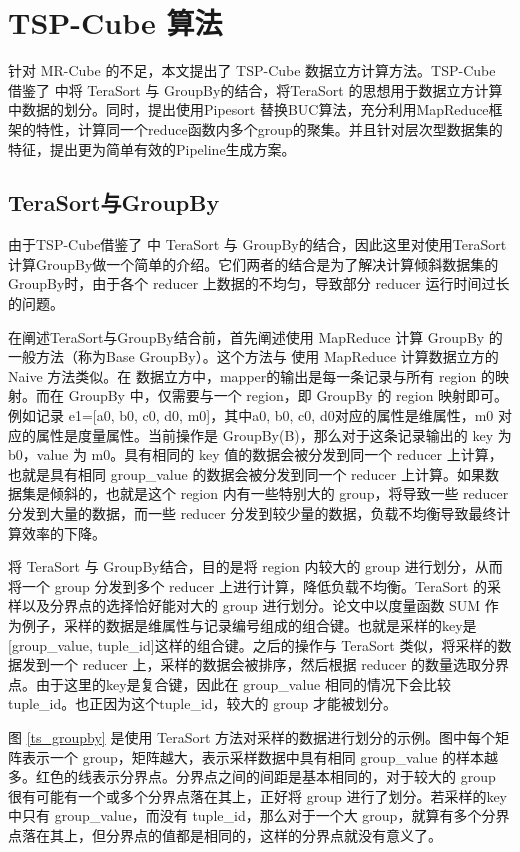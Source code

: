\chapter{TSP-Cube 算法}

针对 MR-Cube 的不足，本文提出了 TSP-Cube 数据立方计算方法。TSP-Cube 借鉴了 \cite{tao2013minimal} 中将 TeraSort 与 GroupBy的结合，将TeraSort 的思想用于数据立方计算中数据的划分。同时，提出使用Pipesort 替换BUC算法，充分利用MapReduce框架的特性，计算同一个reduce函数内多个group的聚集。并且针对层次型数据集的特征，提出更为简单有效的Pipeline生成方案。


\section{TeraSort与GroupBy}

由于TSP-Cube借鉴了 \cite{tao2013minimal} 中 TeraSort 与 GroupBy的结合，因此这里对使用TeraSort计算GroupBy做一个简单的介绍。它们两者的结合是为了解决计算倾斜数据集的GroupBy时，由于各个 reducer 上数据的不均匀，导致部分 reducer 运行时间过长的问题。

在阐述TeraSort与GroupBy结合前，首先阐述使用 MapReduce 计算 GroupBy 的一般方法（称为Base GroupBy）。这个方法与 使用 MapReduce 计算数据立方的 Naive 方法类似。在 数据立方中，mapper的输出是每一条记录与所有 region 的映射。而在 GroupBy 中，仅需要与一个 region，即 GroupBy 的 region 映射即可。例如记录 e1=[a0, b0, c0, d0, m0]，其中a0, b0, c0, d0对应的属性是维属性，m0 对应的属性是度量属性。当前操作是 GroupBy(B)，那么对于这条记录输出的 key 为 b0，value 为 m0。具有相同的 key 值的数据会被分发到同一个 reducer 上计算，也就是具有相同 group\_value 的数据会被分发到同一个 reducer 上计算。如果数据集是倾斜的，也就是这个 region 内有一些特别大的 group，将导致一些 reducer 分发到大量的数据，而一些 reducer 分发到较少量的数据，负载不均衡导致最终计算效率的下降。

将 TeraSort 与 GroupBy结合，目的是将 region 内较大的 group 进行划分，从而将一个 group 分发到多个 reducer 上进行计算，降低负载不均衡。TeraSort 的采样以及分界点的选择恰好能对大的 group 进行划分。论文中以度量函数 SUM 作为例子，采样的数据是维属性与记录编号组成的组合键。也就是采样的key是[group\_value, tuple\_id]这样的组合键。之后的操作与 TeraSort 类似，将采样的数据发到一个 reducer 上，采样的数据会被排序，然后根据 reducer 的数量选取分界点。由于这里的key是复合键，因此在 group\_value 相同的情况下会比较 tuple\_id。也正因为这个tuple\_id，较大的 group 才能被划分。

图 \ref{ts_groupby} 是使用 TeraSort 方法对采样的数据进行划分的示例。图中每个矩阵表示一个 group，矩阵越大，表示采样数据中具有相同 group\_value 的样本越多。红色的线表示分界点。分界点之间的间距是基本相同的，对于较大的 group 很有可能有一个或多个分界点落在其上，正好将 group 进行了划分。若采样的key中只有 group\_value，而没有 tuple\_id，那么对于一个大 group，就算有多个分界点落在其上，但分界点的值都是相同的，这样的分界点就没有意义了。

